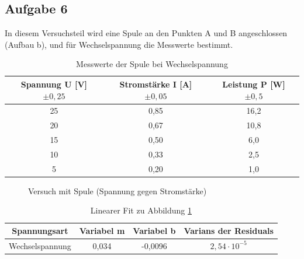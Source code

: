 \subsection{Aufgabe 6}
In diesem Versuchsteil wird eine Spule an den Punkten A und B angeschlossen (Aufbau b), und für Wechselspannung die Messwerte bestimmt.
\begin{table}[H]
  \centering
  \begin{tabular}{c | c | c}
    Spannung U [V] $\pm0,25$ & Stromstärke I [A] $\pm 0,05$ & Leistung P [W] $\pm0,5$\\ \hline
    25 & 0,85 & 16,2\\
    20 & 0,67 & 10,8\\
	15 & 0,50 & 6,0\\
    10 & 0,33 & 2,5\\
    5 & 0,20 & 1,0\\ 
  \end{tabular}
  \caption{Messwerte der Spule bei Wechselspannung}
  \label{tab:messungspulewechsel}
\end{table}
\begin{figure}[H]
  \centering
  \caption{Versuch mit Spule (Spannung gegen Stromstärke)}
  \label{fig:UISpule}
\end{figure}
\begin{table}[H]
  \centering
  \begin{tabular}{c | c | c | c}
    Spannungsart & Variabel m & Variabel b & Varians der Residuals\\ \hline
    Wechselspannung & 0,034 & -0,0096 & $2,54\cdot10^{-5}$
  \end{tabular}
  \caption{Linearer Fit zu Abbildung \ref{fig:UISpule}}
  \label{tab:fitUISpule}
\end{table}
